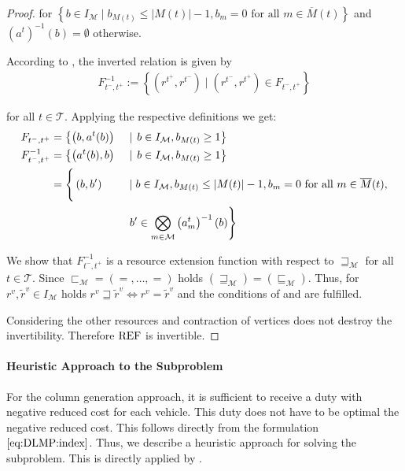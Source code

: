 \begin{proof}
for $\left\{b\in I_{\mathcal{M}}\mid b_{M(t)}\leq\vert M(t)\vert - 1, b_m=0 \text{ for all } m\in\overline{M}(t)\right\}$ and $\left(a^t\right)^{-1}(b) = \emptyset$ otherwise.

According to , the inverted relation is given by
\begin{align*}
	F^{-1}_{t^-,t^+} := \left\{\left(r^{t^+},r^{t^-}\right)\mid \left(r^{t^-},r^{t^+}\right)\in F_{t^-,t^+}\right\}
\end{align*}

for all $t\in\mathcal{T}$. Applying the respective definitions we get:
\begin{align*}
	F_{t^-,t^+} & = \left\{\left(b, a^t(b)\right)\right. && \mid \left. b\in I_{\mathcal{M}}, b_{M(t)}\geq 1\right\} \\
	F^{-1}_{t^-,t^+} & = \left\{\left(a^t(b), b\right)\right. && \mid \left. b\in I_{\mathcal{M}}, b_{M(t)}\geq 1\right\} \\
	& = \left\{\vphantom{\bigotimes_{m\in\mathcal{M}}}\left(b, b'\right)\right. && \mid b\in I_{\mathcal{M}}, b_{M(t)}\leq\vert M(t)\vert-1, b_m=0 \text{ for all } m\in\overline{M}(t), \\
	&&& \left. b'\in\bigotimes_{m\in\mathcal{M}}\left(a^t_m\right)^{-1}(b)\right\}
\end{align*}

We show that $F^{-1}_{t^-,t^+}$ is a resource extension function with respect to $\sqsupseteq_{\mathcal{M}}$ for all $t\in\mathcal{T}$. Since ${\sqsubset_{\mathcal{M}} = \left(=,\dots,=\right)}$ holds ${\left(\sqsupseteq_{\mathcal{M}}\right) = \left(\sqsubseteq_{\mathcal{M}}\right)}$. Thus, for ${r^v,\tilde{r}^v\in I_{\mathcal{M}}}$ holds ${r^v\sqsupseteq\tilde{r}^v\Leftrightarrow r^v = \tilde{r}^v}$ and the conditions of  and  are fulfilled.

Considering the other resources and contraction of vertices does not destroy the invertibility. Therefore $\operatorname{REF}$ is invertible.
%
\end{proof}

\newpage

\paragraph{Heuristic Approach to the Subproblem} \parfill

For the column generation approach, it is sufficient to receive a duty with negative reduced cost for each vehicle. This duty does not have to be optimal \wrt the negative reduced cost. This follows directly from the formulation $\eqref{eq:DLMP:index}$. Thus, we describe a heuristic approach for solving the subproblem. This is directly applied by \cite[pp.~104-107]{Kaiser}.

